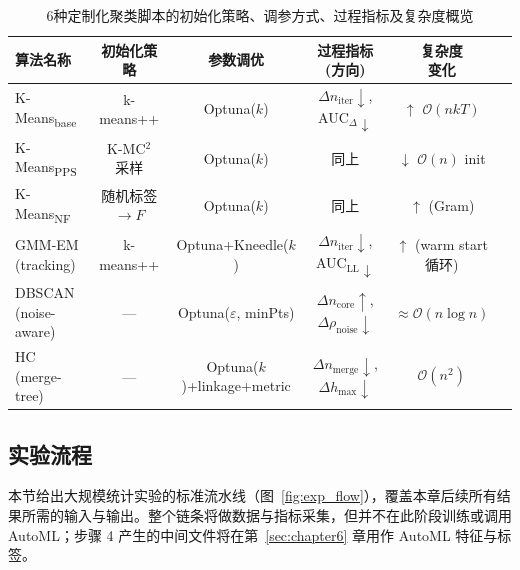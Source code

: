 \documentclass[10pt]{article} %
\numberwithin{equation}{section}
\begin{document}
\begin{table}[t]
\centering
\small
\setlength{\tabcolsep}{4pt}
\renewcommand{\arraystretch}{1.05}
\begin{tabular}{@{}lccccc@{}}
\toprule
\textbf{算法名称} &
\textbf{初始化策略} &
\textbf{参数调优} &
\makecell[c]{\textbf{过程指标}\\(方向)} &
\makecell[c]{\textbf{复杂度}\\变化} \\ 
\midrule
K-Means\textsubscript{base} &
k-means++ &
Optuna($k$) &
$\Delta n_{\text{iter}}\!\downarrow$, AUC$_\Delta\!\downarrow$ &
$\uparrow$ $\mathcal{O}(nkT)$ \\

K-Means\textsubscript{PPS}\cite{10.5555/3016100.3016103} &
K-MC$^{2}$ 采样 &
Optuna($k$) &
同上 &
$\downarrow$ $\mathcal{O}(n)$ init \\

K-Means\textsubscript{NF}\cite{10.1109/TKDE.2022.3155450} &
随机标签$\!\to\!F$ &
Optuna($k$) &
同上 &
$\uparrow$ (Gram) \\

GMM-EM (tracking) &
k-means++ &
Optuna+Kneedle($k$) &
$\Delta n_{\text{iter}}\!\downarrow$, AUC$_{\text{LL}}\!\downarrow$ &
$\uparrow$ (warm start 循环) \\

DBSCAN (noise-aware) &
— &
Optuna($\varepsilon$, minPts) &
$\Delta n_\text{core}\!\uparrow$, $\Delta\rho_\text{noise}\!\downarrow$ &
$\approx\mathcal{O}(n\log n)$ \\

HC (merge-tree) &
— &
Optuna($k$)+linkage+metric &
$\Delta n_\text{merge}\!\downarrow$, $\Delta h_{\max}\!\downarrow$ &
$\mathcal{O}(n^{2})$ \\
\bottomrule
\end{tabular}

\caption{6种定制化聚类脚本的初始化策略、调参方式、过程指标及复杂度概览}
\label{tab:algo_overview_ch5}
\end{table}

\subsection{实验流程}
\label{sec:exp_flow}

本节给出大规模统计实验的标准流水线（图~\ref{fig:exp_flow}），覆盖本章后续所有结果所需的输入与输出。整个链条将做数据与指标采集，但并不在此阶段训练或调用 AutoML；步骤 4 产生的中间文件将在第~\ref{sec:chapter6} 章用作 AutoML 特征与标签。
\end{document}
